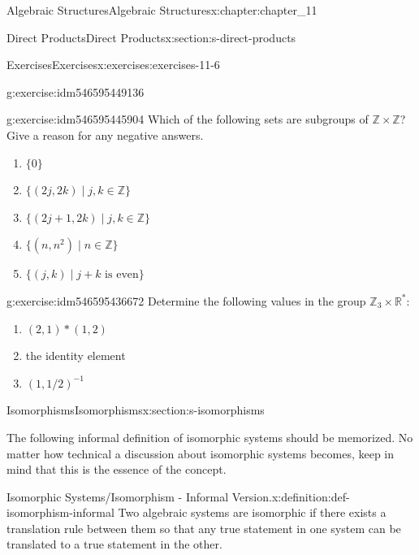 \documentclass[oneside,10pt,]{book}
\numberwithin{equation}{section}
\begin{document}
\begin{chapterptx}{Algebraic Structures}{}{Algebraic Structures}{}{}{x:chapter:chapter_11}
\begin{sectionptx}{Direct Products}{}{Direct Products}{}{}{x:section:s-direct-products}
\begin{exercises-subsection}{Exercises}{}{Exercises}{}{}{x:exercises:exercises-11-6}
\begin{divisionexercise}{4}{}{}{g:exercise:idm546595449136}
\begin{enumerate}[label=(\alph*)]
\end{enumerate}
%
\end{divisionexercise}%
\begin{divisionexercise}{5}{}{}{g:exercise:idm546595445904}%
Which of the following sets are subgroups of \(\mathbb{Z} \times  \mathbb{Z}\)? Give a reason for any negative answers.%
\begin{enumerate}[label=(\alph*)]
\item{}\(\{0\}\)%
\item{}\(\{(2j, 2k) \mid j,k\in  \mathbb{Z}\}\)%
\item{}\(\{(2j+ 1, 2k) \mid j,k\in \mathbb{Z}\}\)%
\item{}\(\{(n, n^2 ) \mid n \in \mathbb{Z}\}\)%
\item{}\(\{(j, k) \mid j + k\textrm{ is} \textrm{ even}\}\)%
\end{enumerate}
%
\end{divisionexercise}%
\begin{divisionexercise}{6}{}{}{g:exercise:idm546595436672}%
Determine the following values in the group \(\mathbb{Z}_3 \times  \mathbb{R}^*\):%
\begin{enumerate}[label=(\alph*)]
\item{}\((2,1)* (1,2)\)%
\item{}the identity element%
\item{}\((1, 1/2)^{-1}\)%
\end{enumerate}
%
\end{divisionexercise}%
\end{exercises-subsection}
\end{sectionptx}
%
%
\typeout{************************************************}
\typeout{************************************************}
%
\begin{sectionptx}{Isomorphisms}{}{Isomorphisms}{}{}{x:section:s-isomorphisms}
%
\begin{introduction}{}%
The following informal definition of isomorphic systems should be memorized. No matter how technical a discussion about isomorphic systems becomes, keep in mind that this is the essence of the concept.%
\begin{definition}{Isomorphic Systems\slash{}Isomorphism - Informal Version.}{x:definition:def-isomorphism-informal}%
Two algebraic systems are isomorphic if there exists a translation rule between them so that any true statement in one system can be translated to a true statement in the other.%
\end{definition}

\end{introduction}
\end{sectionptx}
\end{chapterptx}
\end{document}
